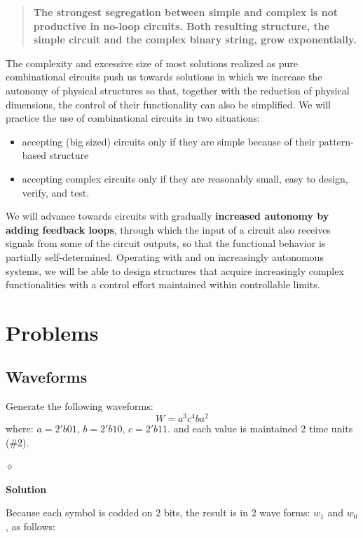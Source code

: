 \begin{quote}
{\bf The strongest segregation between simple and complex is not
productive in no-loop circuits. Both resulting structure, the
simple circuit and the complex binary string, grow exponentially.}
\end{quote}

The complexity and excessive size of most solutions realized as pure combinational circuits push us towards solutions in which we increase the autonomy of physical structures so that, together with the reduction of physical dimensions,  the control of their functionality can also be simplified. We will practice the use of combinational circuits in two situations:
\begin{itemize}
\item accepting (big sized) circuits only if they are simple because of their pattern-based structure
\item accepting complex circuits only if they are reasonably small, easy to design, verify, and test.
\end{itemize}

We will advance towards circuits with gradually {\bf increased autonomy by adding feedback loops}, through which the input of a circuit also receives signals from some of the circuit outputs, so that the functional behavior is partially self-determined. Operating with and on increasingly autonomous systems, we will be able to design structures that acquire increasingly complex functionalities with a control effort maintained within controllable limits.



\section{Problems}


\subsection{Waveforms}

\begin{problem}
Generate the following waveforms:
$$W = a^3c^4ba^2$$
where: $a = 2'b01$, $b = 2'b10$, $c = 2'b11$. and each value is maintained 2 time units (\#2).

$\diamond$
\end{problem}

{\bf Solution}

Because each symbol is codded on 2 bits, the result is in 2 wave forms: $w_1$ and $w_0$, as follows:

